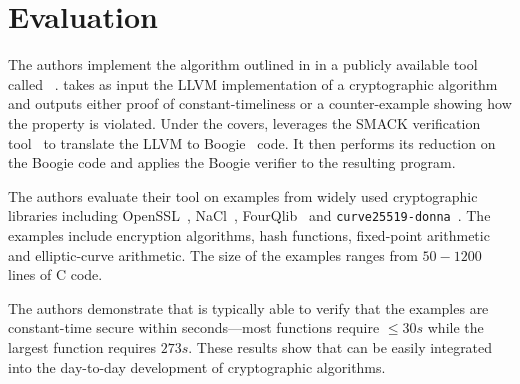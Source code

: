 \section{Evaluation}
\label{sec:eval}

The authors implement the algorithm outlined in  in a publicly available tool called \ctVerif~\cite{ct-verif-github}.
\ctVerif takes as input the LLVM implementation of a cryptographic algorithm and outputs either proof of constant-timeliness or a counter-example showing how the property is violated.
Under the covers, \ctVerif leverages the SMACK verification tool~\cite{smack} to translate the LLVM to Boogie~\cite{boogie} code.
It then performs its reduction on the Boogie code and applies the Boogie verifier to the resulting program.

The authors evaluate their tool on examples from widely used cryptographic libraries including OpenSSL~\cite{openssl}, NaCl~\cite{nacl}, FourQlib~\cite{fourqlib} and \texttt{curve25519-donna}~\cite{donna}. The examples include encryption algorithms, hash functions, fixed-point arithmetic and elliptic-curve arithmetic.
The size of the examples ranges from $50-1200$ lines of C code.

The authors demonstrate that \ctVerif is typically able to verify that the examples are constant-time secure within seconds---most functions require $\leq 30s$ while the largest function requires $273s$.
These results show that \ctVerif can be easily integrated into the day-to-day development of cryptographic algorithms.
